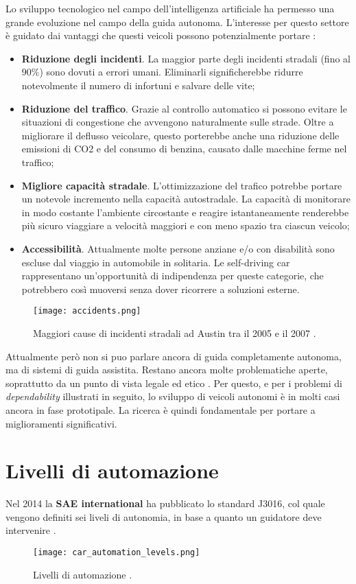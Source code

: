 Lo sviluppo tecnologico nel campo dell'intelligenza artificiale ha permesso una grande evoluzione nel campo della guida autonoma. L'interesse per questo 
settore è guidato dai vantaggi che questi veicoli possono potenzialmente portare \cite{advantages}:
\begin{itemize}
    \item \textbf{Riduzione degli incidenti}. La maggior parte degli incidenti stradali (fino al $90\%$) sono dovuti a errori umani. Eliminarli
    significherebbe ridurre notevolmente il numero di infortuni e salvare delle vite;
    \item \textbf{Riduzione del traffico}. Grazie al controllo automatico si possono evitare le situazioni di congestione che avvengono naturalmente sulle strade.
    Oltre a migliorare il deflusso veicolare, questo porterebbe anche  una riduzione delle emissioni di CO2 e del consumo di benzina, causato dalle macchine ferme nel traffico;
    \item \textbf{Migliore capacità stradale}. L'ottimizzazione del trafico potrebbe portare un notevole incremento nella capacità autostradale. La capacità
    di monitorare in modo costante l'ambiente circostante e reagire istantaneamente renderebbe più sicuro viaggiare a velocità maggiori e con meno spazio tra ciascun veicolo;
    \item \textbf{Accessibilità}. Attualmente  molte persone anziane  e/o con disabilità sono escluse dal viaggio in automobile in solitaria. Le self-driving car rappresentano un'opportunità
    di indipendenza per queste categorie, che potrebbero così muoversi senza dover ricorrere a soluzioni esterne.
\end{itemize}
\begin{figure}
    \texttt{[image: accidents.png]}
    \caption{Maggiori cause di incidenti stradali ad Austin tra il 2005 e il 2007 \cite{accid}.}
    \label{fig:accid}
\end{figure}
Attualmente però non si puo parlare ancora di guida completamente autonoma, ma di sistemi di guida assistita. Restano ancora molte problematiche aperte, soprattutto 
da un punto di vista legale \cite{legal} ed etico \cite{Lin2015}. Per questo, e per i problemi di \emph{dependability} illustrati in seguito, lo sviluppo
di veicoli autonomi è in molti casi ancora in fase prototipale. La ricerca è quindi fondamentale per portare a miglioramenti significativi.
\section{Livelli di automazione}
Nel 2014 la \textbf{SAE international} ha pubblicato lo standard J3016, col quale vengono definiti sei liveli di autonomia, in base a quanto un guidatore deve intervenire \cite{sae}.
\begin{figure}
    \texttt{[image: car\_automation\_levels.png]}
    \caption{Livelli di automazione \cite{car}.}
    \label{fig:adaslevel}
\end{figure}
